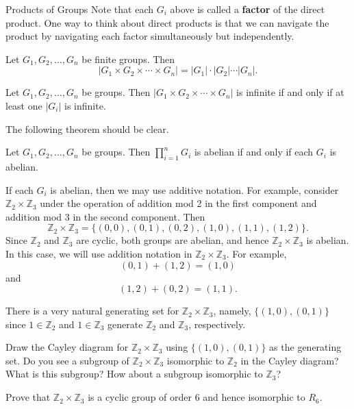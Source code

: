 \begin{section}{Products of Groups}
Note that each $G_i$ above is called a \textbf{factor} of the direct product.  One way to think about direct products is that we can navigate the product by navigating each factor simultaneously but independently. 

\begin{theorem}
Let $G_1, G_2,\ldots, G_n$ be finite groups.  Then
\[
|G_1\times G_2\times \cdots \times G_n|=|G_1|\cdot|G_2|\cdots |G_n|.
\]
\end{theorem}

\begin{theorem}
Let $G_1, G_2,\ldots, G_n$ be groups.  Then $|G_1\times G_2\times \cdots \times G_n|$ is infinite if and only if at least one $|G_i|$ is infinite.
\end{theorem}


The following theorem should be clear.

\begin{theorem}\label{thm:product_abelian_groups}
Let $G_1, G_2,\ldots, G_n$ be groups.  Then $\prod_{i=1}^nG_i$ is abelian if and only if each $G_i$ is abelian.
\end{theorem}

If each $G_i$ is abelian, then we may use additive notation.  For example, consider $\mathbb{Z}_2\times \mathbb{Z}_3$ under the operation of addition mod 2 in  the first component and addition mod 3 in the second component.  Then
\[
\mathbb{Z}_2\times \mathbb{Z}_3=\{(0,0),(0,1),(0,2),(1,0),(1,1),(1,2)\}.
\]
Since $\mathbb{Z}_2$ and $\mathbb{Z}_3$ are cyclic, both groups are abelian, and hence $\mathbb{Z}_2\times \mathbb{Z}_3$ is abelian.  In this case, we will use addition notation in $\mathbb{Z}_2\times \mathbb{Z}_3$.  For example,
\[
(0,1)+(1,2)=(1,0)
\]
and
\[
(1,2)+(0,2)=(1,1).
\]

There is a very natural generating set for $\mathbb{Z}_2\times \mathbb{Z}_3$, namely, $\{(1,0),(0,1)\}$ since $1\in \mathbb{Z}_2$ and $1\in \mathbb{Z}_3$ generate $\mathbb{Z}_2$ and $\mathbb{Z}_3$, respectively.

\begin{exercise}
Draw the Cayley diagram for $\mathbb{Z}_2\times \mathbb{Z}_3$ using $\{(1,0),(0,1)\}$ as the generating set.  Do you see a subgroup of $\mathbb{Z}_2\times \mathbb{Z}_3$ isomorphic to $\mathbb{Z}_2$ in the Cayley diagram?  What is this subgroup?  How about a subgroup isomorphic to $\mathbb{Z}_3$?
\end{exercise}

\begin{exercise}
Prove that $\mathbb{Z}_2\times \mathbb{Z}_3$ is a cyclic group of order 6 and hence isomorphic to $R_6$.  
\end{exercise}


\end{section}
